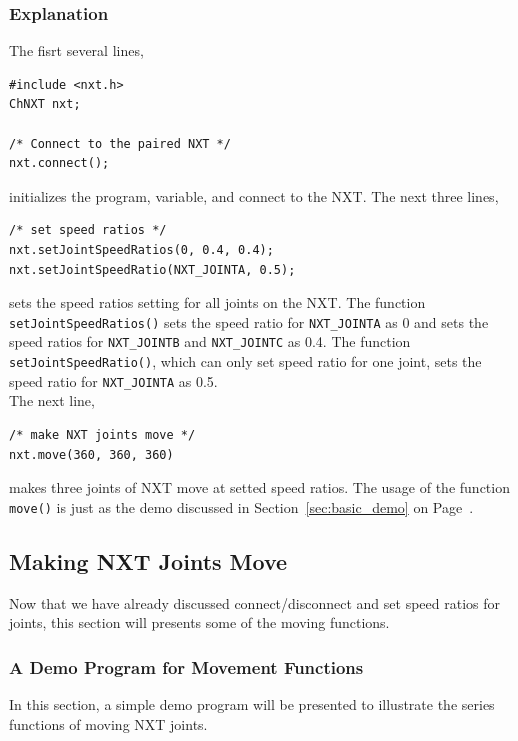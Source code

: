 \documentclass[11pt]{article}
\begin{document}
\subsubsection*{Explanation}
The fisrt several lines,
\begin{lstlisting}
#include <nxt.h>
ChNXT nxt;

/* Connect to the paired NXT */
nxt.connect();
\end{lstlisting}
initializes the program, variable, and connect to the NXT. The next three lines,
\begin{lstlisting}
/* set speed ratios */
nxt.setJointSpeedRatios(0, 0.4, 0.4);
nxt.setJointSpeedRatio(NXT_JOINTA, 0.5);
\end{lstlisting}
sets the speed ratios setting for all joints on the NXT. The function 
{\tt setJointSpeedRatios()} sets the speed ratio for {\tt NXT\_JOINTA} as 0 and 
sets the speed ratios for {\tt NXT\_JOINTB} and {\tt NXT\_JOINTC} as 0.4. The 
function {\tt setJointSpeedRatio()}, which can only set speed ratio for one joint, 
sets the speed ratio for {\tt NXT\_JOINTA} as 0.5.\\

The next line,
\begin{lstlisting}
/* make NXT joints move */
nxt.move(360, 360, 360)
\end{lstlisting}
makes three joints of NXT move at setted speed ratios. The usage of the function 
{\tt move()} is just as the demo discussed in Section~\ref{sec:basic_demo} on 
Page~\pageref{sec:basic_demo}.

\subsection{\label{sec:move_demo}Making NXT Joints Move}
Now that we have already discussed connect/disconnect and set speed ratios for 
joints, this section will presents some of the moving functions.

\subsubsection{A Demo Program for Movement Functions}
In this section, a simple demo program will be presented to illustrate the series 
functions of moving NXT joints.
\end{document}
